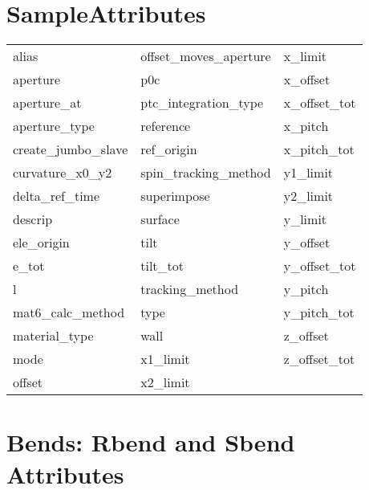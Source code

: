  \section{SampleAttributes}
 \label{s:list.sample}
 
 \begin{tabular}{lll} \toprule
alias                       & offset_moves_aperture       & x_limit                     \\
aperture                    & p0c                         & x_offset                    \\
aperture_at                 & ptc_integration_type        & x_offset_tot                \\
aperture_type               & reference                   & x_pitch                     \\
create_jumbo_slave          & ref_origin                  & x_pitch_tot                 \\
curvature_x0_y2             & spin_tracking_method        & y1_limit                    \\
delta_ref_time              & superimpose                 & y2_limit                    \\
descrip                     & surface                     & y_limit                     \\
ele_origin                  & tilt                        & y_offset                    \\
e_tot                       & tilt_tot                    & y_offset_tot                \\
l                           & tracking_method             & y_pitch                     \\
mat6_calc_method            & type                        & y_pitch_tot                 \\
material_type               & wall                        & z_offset                    \\
mode                        & x1_limit                    & z_offset_tot                \\
offset                      & x2_limit                    &                             \\
 \bottomrule
 \end{tabular}
 \vfill
 
 \section{Bends: Rbend and Sbend Attributes}
 \label{s:list.bend}
 
